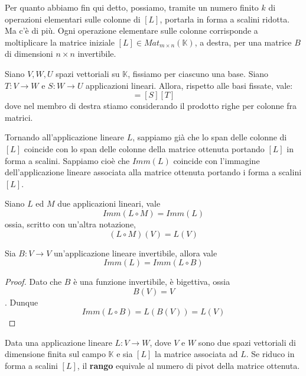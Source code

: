 Per quanto abbiamo fin qui detto, possiamo, tramite un numero finito $k$ di
operazioni elementari sulle colonne di $[L]$, portarla in forma a scalini
ridotta. Ma c'\`e di pi\`u. Ogni operazione elementare sulle colonne corrisponde
a moltiplicare la matrice iniziale $[L] \in Mat_{m \times n}(\mathbb{K})$,
a destra, per una matrice $B$ di dimensioni $n \times n$ invertibile.

\begin{theorem}
	Siano $V, W, U$ spazi vettoriali su $\mathbb{K}$, fissiamo per ciascuno
	una base. Siano $T : V \to W$ e $S : W \to U$ applicazioni lineari. Allora,
	rispetto alle basi fissate, vale:
	\begin{equation*}
		[S \circ T] = [S][T]
	\end{equation*}
	dove nel membro di destra stiamo considerando il prodotto righe per colonne
	fra matrici.
\end{theorem}

Tornando all'applicazione lineare $L$, sappiamo già che lo span delle colonne
di $[L]$ coincide con lo span delle colonne della matrice ottenuta portando $[L]$
in forma a scalini. Sappiamo cio\`e che $Imm(L)$ coincide con l'immagine
dell'applicazione lineare associata alla matrice ottenuta portando i forma a
scalini $[L]$.

\begin{proposition}
	Siano $L$ ed $M$ due applicazioni lineari, vale
	\[ Imm(L \circ M) = Imm(L) \]
	ossia, scritto con un'altra notazione,
	\[ (L \circ M)(V) = L(V) \]
\end{proposition}

\begin{proposition}
	Sia $B : V \to V$ un'applicazione lineare invertibile, allora vale
	\[ Imm(L) = Imm(L \circ B) \]
	\begin{proof}
		Dato che $B$ \`e una funzione invertibile, \`e bigettiva, ossia
		\[ B(V) = V \]. Dunque
		\begin{equation*}
			Imm(L \circ B) = L(B(V)) = L(V)
		\end{equation*}
	\end{proof}
\end{proposition}

\begin{defn}
	Data una applicazione lineare $L : V \to W$, dove $V$ e $W$ sono due spazi
	vettoriali di dimensione finita sul campo $\mathbb{K}$ e sia $[L]$ la matrice
	associata ad $L$. Se riduco in forma a scalini $[L]$, il \textbf{rango} equivale
	al numero di pivot della matrice ottenuta.
\end{defn}

